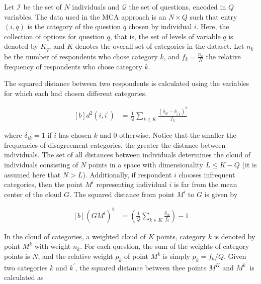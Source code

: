 \documentclass[conference]{IEEEtran}
\begin{document}
Let \(\mathcal{I}\) be the set of \(N\) individuals and \(\mathcal{Q}\)
the set of questions, encoded in \(Q\) variables. The data used in the
MCA approach is an \(N \times Q\) such that entry \((i, q)\) is the
category of the question \(q\) chosen by individual \(i\). Here, the
collection of options for question \(q\), that is, the set of levels of
variable \(q\) is denoted by \(K_q\), and \(K\) denotes the overall set
of categories in the dataset. Let \(n_k\) be the number of respondents
who chose category \(k\), and \(f_k = \frac{n_k}{N}\) the relative
frequency of respondents who chose category \(k\).

The squared distance between two respondents is calculated using the
variables for which each had chosen different categories.

\begin{equation}
\begin{aligned}[b]
\label{eq:distInd}
d^2(i, i^{\prime}) &= \frac{1}{Q} \sum_{k\in K} \frac{(\delta_{ik} - \delta_{i^{\prime}k})^2}{f_k}  
\end{aligned}
\end{equation}

where \(\delta_{ik} = 1\) if \(i\) has chosen \(k\) and \(0\) otherwise.
Notice that the smaller the frequencies of disagreement categories, the
greater the distance between individuals. The set of all distances
between individuals determines the cloud of individuals consisting of
\(N\) points in a space with dimensionality \(L\leq K - Q\)
\cite{greenacre2006multiple} (it is assumed here that \(N > L\)).
Additionally, if respondent \(i\) chooses infrequent categories, then
the point \(M^i\) representing individual \(i\) is far from the mean
center of the cloud \(G\). The squared distance from point \(M^i\) to
\(G\) is given by

\begin{equation}
\begin{aligned}[b]
\label{eq:distGM}
(GM^i)^2 &= \left( \frac{1}{Q} \sum_{k\in K} \frac{\delta_{ik}}{f_k}  \right) -1
\end{aligned}
\end{equation}

In the cloud of categories, a weighted cloud of \(K\) points, category
\(k\) is denoted by point \(M^k\) with weight \(n_k.\) For each
question, the sum of the weights of category points is \(N\), and the
relative weight \(p_k\) of point \(M^k\) is simply \(p_k = f_k / Q\).
Given two categories \(k\) and \(k^{\prime}\), the squared distance
between thee points \(M^K\) and \(M^{k^{\prime}}\) is calculated as
\end{document}
